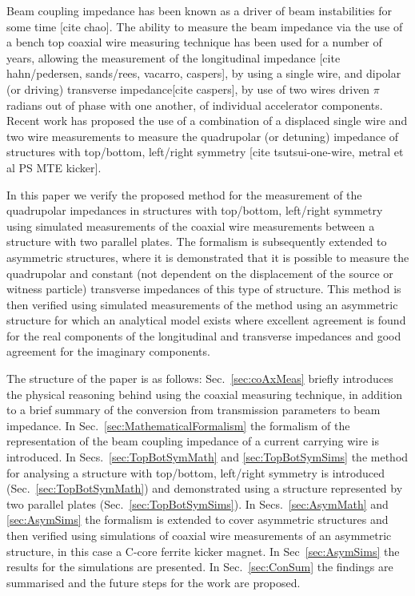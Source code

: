 \documentclass[review, number, sort&compress]{elsarticle}
\begin{document}
Beam coupling impedance has been known as a driver of beam instabilities for some time [cite chao]. The ability to measure the beam impedance via the use of a bench top coaxial wire measuring technique has been used for a number of years, allowing the measurement of the longitudinal impedance [cite hahn/pedersen, sands/rees, vacarro, caspers], by using a single wire, and dipolar (or driving) transverse impedance[cite caspers], by use of two wires driven $\pi$ radians out of phase with one another,  of individual accelerator components. Recent work has proposed the use of a combination of a displaced single wire and two wire measurements to measure the quadrupolar (or detuning) impedance of structures with top/bottom, left/right symmetry [cite tsutsui-one-wire, metral et al PS MTE kicker]. 

In this paper we verify the proposed method for the measurement of the quadrupolar impedances in structures with top/bottom, left/right symmetry using simulated measurements of the coaxial wire measurements between a structure with two parallel plates. The formalism is subsequently extended to asymmetric structures, where it is demonstrated that it is possible to measure the quadrupolar and constant (not dependent on the displacement of the source or witness particle) transverse impedances of this type of structure. This method is then verified using simulated measurements of the method using an asymmetric structure for which an analytical model exists where excellent agreement is found for the real components of the longitudinal and transverse impedances and good agreement for the imaginary components.

The structure of the paper is as follows: Sec.~\ref{sec:coAxMeas} briefly introduces the physical reasoning behind using the coaxial measuring technique, in addition to a brief summary of the conversion from transmission parameters to beam impedance. In Sec.~\ref{sec:MathematicalFormalism} the formalism of the representation of the beam coupling impedance of a current carrying wire is introduced. In Secs.~\ref{sec:TopBotSymMath} and \ref{sec:TopBotSymSims} the method for analysing a structure with top/bottom, left/right symmetry is introduced (Sec.~\ref{sec:TopBotSymMath}) and demonstrated using a structure represented by two parallel plates (Sec.~\ref{sec:TopBotSymSims}). In Secs.~\ref{sec:AsymMath} and \ref{sec:AsymSims} the formalism is extended to cover asymmetric structures and then verified using simulations of coaxial wire measurements of an asymmetric structure, in this case a C-core ferrite kicker magnet. In Sec~\ref{sec:AsymSims} the results for the simulations are presented. In Sec.~\ref{sec:ConSum} the findings are summarised and the future steps for the work are proposed.
\end{document}
